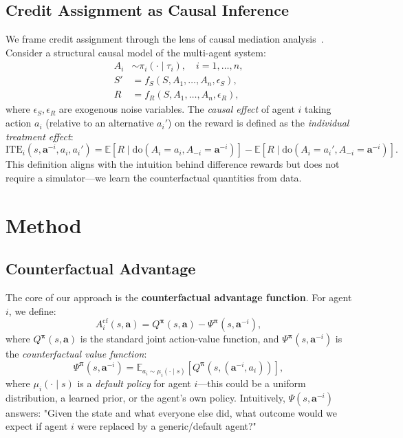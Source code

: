 \documentclass[journal]{IEEEtran}
\newcommand{\EE}{\mathbb{E}}
\begin{document}
\subsection{Credit Assignment as Causal Inference}

We frame credit assignment through the lens of causal mediation analysis~\cite{pearl2009causality}. Consider a structural causal model of the multi-agent system:
\begin{align}
    A_i &\sim \pi_i(\cdot \mid \tau_i), \quad i = 1, \ldots, n,\\
    S' &= f_S(S, A_1, \ldots, A_n, \epsilon_S),\\
    R &= f_R(S, A_1, \ldots, A_n, \epsilon_R),
\end{align}
where $\epsilon_S, \epsilon_R$ are exogenous noise variables. The \emph{causal effect} of agent $i$ taking action $a_i$ (relative to an alternative $a_i'$) on the reward is defined as the \emph{individual treatment effect}:
\begin{equation}
    \text{ITE}_i(s, \mathbf{a}^{-i}, a_i, a_i') = \EE[R \mid \text{do}(A_i = a_i, A_{-i} = \mathbf{a}^{-i})] - \EE[R \mid \text{do}(A_i = a_i', A_{-i} = \mathbf{a}^{-i})].
\end{equation}
This definition aligns with the intuition behind difference rewards but does not require a simulator---we learn the counterfactual quantities from data.

\section{Method}
\label{sec:method}

\subsection{Counterfactual Advantage}

The core of our approach is the \textbf{counterfactual advantage function}. For agent $i$, we define:
\begin{equation}
    A_i^{\text{cf}}(s, \mathbf{a}) = Q^{\bm{\pi}}(s, \mathbf{a}) - \Psi^{\bm{\pi}}(s, \mathbf{a}^{-i}),
    \label{eq:cf_advantage}
\end{equation}
where $Q^{\bm{\pi}}(s, \mathbf{a})$ is the standard joint action-value function, and $\Psi^{\bm{\pi}}(s, \mathbf{a}^{-i})$ is the \emph{counterfactual value function}:
\begin{equation}
    \Psi^{\bm{\pi}}(s, \mathbf{a}^{-i}) = \EE_{a_i \sim \mu_i(\cdot \mid s)}\left[Q^{\bm{\pi}}(s, (\mathbf{a}^{-i}, a_i))\right],
    \label{eq:psi_def}
\end{equation}
where $\mu_i(\cdot \mid s)$ is a \emph{default policy} for agent $i$---this could be a uniform distribution, a learned prior, or the agent's own policy. Intuitively, $\Psi(s, \mathbf{a}^{-i})$ answers: "Given the state and what everyone else did, what outcome would we expect if agent $i$ were replaced by a generic/default agent?"
\end{document}
